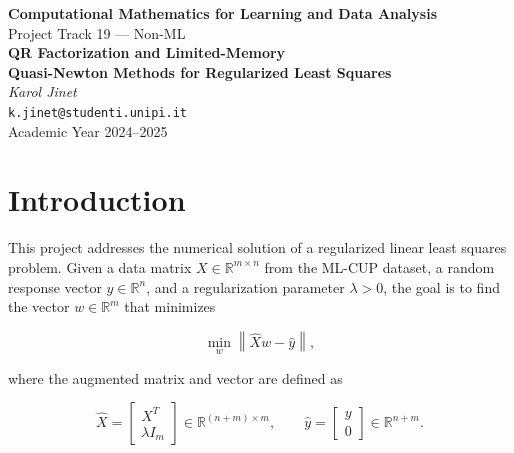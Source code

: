 \documentclass[11pt,a4paper]{article}
\newcommand{\R}{\mathbb{R}}
\newcommand{\norm}[1]{\left\|#1\right\|}
\newcommand{\Xhat}{\hat{X}}
\newcommand{\yhat}{\hat{y}}
\begin{document}
\begin{center}
    {\Large\bfseries Computational Mathematics for Learning and Data Analysis}\\[6pt]
    {\large Project Track 19 --- Non-ML}\\[12pt]
    {\large\bfseries QR Factorization and Limited-Memory \\Quasi-Newton Methods for Regularized Least Squares}\\[12pt]
    
    \textit{Karol Jinet}\\
    \texttt{k.jinet@studenti.unipi.it}\\[6pt]
    Academic Year 2024--2025
\end{center}

\vspace{1cm}

\tableofcontents
\newpage

\section{Introduction}
\label{sec:intro}

This project addresses the numerical solution of a regularized linear least squares problem. 
Given a data matrix $X \in \R^{m \times n}$ from the ML-CUP dataset, a random response vector 
$y \in \R^n$, and a regularization parameter $\lambda > 0$, the goal is to find the vector 
$w \in \R^m$ that minimizes

\begin{equation}
\label{eq:problem}
    \min_w \norm{\Xhat w - \yhat},
\end{equation}

where the augmented matrix and vector are defined as

\begin{equation}
\label{eq:augmented}
    \Xhat = \begin{bmatrix} X^T \\ \lambda I_m \end{bmatrix} \in \R^{(n+m) \times m}, 
    \qquad
    \yhat = \begin{bmatrix} y \\ 0 \end{bmatrix} \in \R^{n+m}.
\end{equation}
\end{document}
